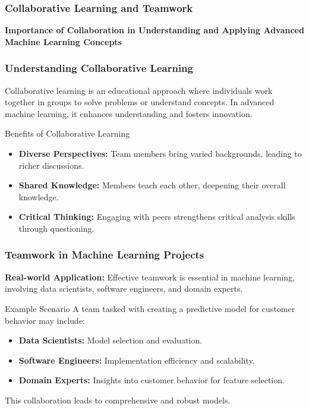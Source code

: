 \documentclass[aspectratio=169]{beamer}
\begin{document}
\begin{frame}[fragile]
    \frametitle{Collaborative Learning and Teamwork}
    \textbf{Importance of Collaboration in Understanding and Applying Advanced Machine Learning Concepts}
\end{frame}

\begin{frame}[fragile]
    \frametitle{Understanding Collaborative Learning}
    Collaborative learning is an educational approach where individuals work together in groups to solve problems or understand concepts. In advanced machine learning, it enhances understanding and fosters innovation.
    
    \begin{block}{Benefits of Collaborative Learning}
        \begin{itemize}
            \item \textbf{Diverse Perspectives:} 
            Team members bring varied backgrounds, leading to richer discussions.
            
            \item \textbf{Shared Knowledge:} 
            Members teach each other, deepening their overall knowledge.
            
            \item \textbf{Critical Thinking:} 
            Engaging with peers strengthens critical analysis skills through questioning.
        \end{itemize}
    \end{block}
\end{frame}

\begin{frame}[fragile]
    \frametitle{Teamwork in Machine Learning Projects}
    \textbf{Real-world Application:}
    Effective teamwork is essential in machine learning, involving data scientists, software engineers, and domain experts.

    \begin{block}{Example Scenario}
        A team tasked with creating a predictive model for customer behavior may include:
        \begin{itemize}
            \item \textbf{Data Scientists:} Model selection and evaluation.
            \item \textbf{Software Engineers:} Implementation efficiency and scalability.
            \item \textbf{Domain Experts:} Insights into customer behavior for feature selection.
        \end{itemize}
        This collaboration leads to comprehensive and robust models.
    \end{block}
\end{frame}
\end{document}
